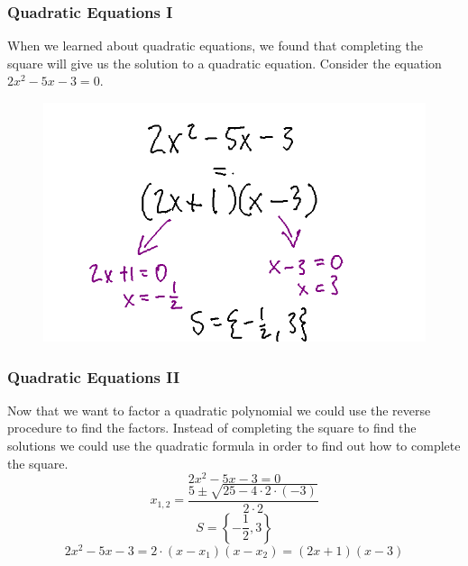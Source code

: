 \documentclass[xcolor=dvipsnames]{beamer}
\begin{document}
\begin{frame}
  \frametitle{Quadratic Equations I}
  When we learned about quadratic equations, we found that completing
  the square will give us the solution to a quadratic equation.
  Consider the equation $2x^{2}-5x-3=0$.
  \begin{figure}[h]
    \includegraphics[scale=.4]{./qfac6.png}
  \end{figure}
\end{frame}

\begin{frame}
  \frametitle{Quadratic Equations II}
  Now that we want to factor a quadratic polynomial we could use the
  reverse procedure to find the factors. Instead of completing the
  square to find the solutions we could use the quadratic formula in
  order to find out how to complete the square. 
\begin{equation}
  \label{eq:aivaquie}
2x^{2}-5x-3=0
\end{equation}
\begin{equation}
  \label{eq:aiviaquo}
x_{1,2}=\frac{5\pm\sqrt{25-4\cdot{}2\cdot(-3)}}{2\cdot{}2}
\end{equation}
\begin{equation}
  \label{eq:achohgeo}
S=\left\{-\frac{1}{2},3\right\}
\end{equation}
\begin{equation}
  \label{eq:phopiini}
2x^{2}-5x-3=2\cdot(x-x_{1})(x-x_{2})=(2x+1)(x-3)
\end{equation}
\end{frame}
\end{document}
